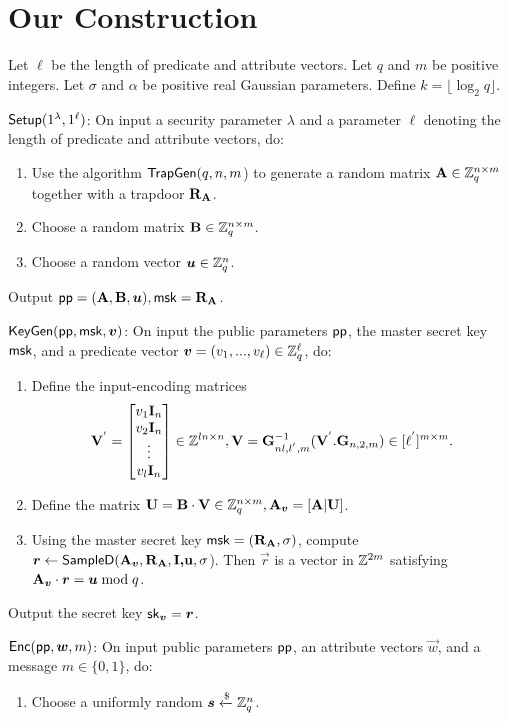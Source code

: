 \section{Our Construction}
Let $\ell$ be the length of predicate and attribute vectors. Let $q$ and $m$ be positive integers. Let $\sigma$ and $\alpha$ be positive real Gaussian parameters. Define $k=\lfloor \log_{2}q\rfloor$. 
\begin{description}
\item $\mathsf{Setup}(1^{\lambda},1^{\ell})$: On input a security parameter $\lambda$ and a parameter $\ell$ denoting the length of predicate and attribute vectors, do:
\begin{enumerate}
  \item Use the algorithm $\mathsf{TrapGen}(q, n, m$) to generate a random matrix $\mathbf{A} \in \mathbb{Z}^{n \times m}_{q}$ together with a trapdoor $\mathbf{R}_{\mathbf{A}}$.
  \item Choose a random matrix $\mathbf{B} \in \mathbb{Z}^{n \times m}_{q}$.
  \item Choose a random vector $\boldsymbol{u} \in \mathbb{Z}^{n}_{q}$.
\end{enumerate}
Output $\mathsf{pp}=(\mathbf{A}, \mathbf{B}, \boldsymbol{u}), \mathsf{msk}=\mathbf{R}_{\mathbf{A}}$.

\item $\mathsf{KeyGen}(\mathsf{pp},\mathsf{msk},\boldsymbol{v})$: On input the public parameters $\mathsf{pp}$, the master secret key $\mathsf{msk}$, and a predicate vector $\boldsymbol{v}=(v_{1},...,v_{\ell}) \in \mathbb{Z}^{\ell}_{q}$, do:
\begin{enumerate}
\item Define the input-encoding matrices
\begin{equation}
\mathbf{V}^{'}= \begin{bmatrix}
v_{1} \mathbf{I}_{n}\\
v_{2} \mathbf{I}_{n}\\
\vdots\\
v_{l} \mathbf{I}_{n}
\end{bmatrix} \in \mathbb{Z}^{ln \times n},\mathbf{V}=\mathbf{G}^{-1}_{nl,l^{'},m}(\mathbf{V}^{'}.\mathbf{G}_{n,2,m}) \in [\ell^{'}]^{m \times m}.
\end{equation}

\item Define the  matrix $\mathbf{U}=\mathbf{B} \cdot \mathbf{V} \in \mathbb{Z}^{n \times m}_{q}, \mathbf{A}_{\boldsymbol{v}}=[\mathbf{A}|\mathbf{U}]$.
\item Using the master secret key $\mathsf{msk}=(\mathbf{R}_{\mathbf{A}},\sigma)$, compute $\boldsymbol{r} \leftarrow \mathsf{SampleD}(\mathbf{A}_{\boldsymbol{v}},\mathbf{R}_{\mathbf{A}},\textbf{I,u},\sigma$). Then $\vec{r}$ is a vector in $\mathbb{Z}^{2m}$ satisfying $\mathbf{A}_{\boldsymbol{v}} \cdot \boldsymbol{r}=\boldsymbol{u} \bmod q$.
\end{enumerate}
Output the secret key $\mathsf{sk}_{\boldsymbol{v}}=\boldsymbol{r}$.
\item $\mathsf{Enc}(\mathsf{pp},\boldsymbol{w},m)$: On input public parameters $\mathsf{pp}$, an attribute vectors $\vec{w}$, and a message $m \in \{0,1\}$, do:
\begin{enumerate}
\item Choose a uniformly random $\boldsymbol{s}\xleftarrow{\$} \mathbb{Z}^{n}_{q}$.


\end{enumerate}
\end{description}
